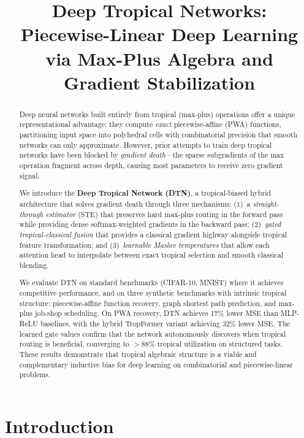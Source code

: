 \documentclass[11pt,twocolumn]{article}
\title{Deep Tropical Networks: Piecewise-Linear Deep Learning\\via Max-Plus Algebra and Gradient Stabilization}
\author{%
}
\date{}
\begin{document}
\maketitle

\begin{abstract}
Deep neural networks built entirely from tropical (max-plus) operations
offer a unique representational advantage: they compute \emph{exact}
piecewise-affine (PWA) functions, partitioning input space into polyhedral
cells with combinatorial precision that smooth networks can only approximate.
However, prior attempts to train deep tropical networks have been blocked by
\emph{gradient death}---the sparse subgradients of the max operation fragment
across depth, causing most parameters to receive zero gradient signal.

We introduce the \textbf{Deep Tropical Network (DTN)}, a tropical-biased
hybrid architecture that solves gradient death through three mechanisms:
(1)~a \emph{straight-through estimator} (STE) that preserves hard max-plus
routing in the forward pass while providing dense softmax-weighted gradients
in the backward pass;
(2)~\emph{gated tropical-classical fusion} that provides a classical gradient
highway alongside tropical feature transformation; and
(3)~\emph{learnable Maslov temperatures} that allow each attention head to
interpolate between exact tropical selection and smooth classical blending.

We evaluate DTN on standard benchmarks (CIFAR-10, MNIST) where it achieves
competitive performance, and on three synthetic benchmarks with intrinsic
tropical structure: piecewise-affine function recovery, graph shortest path
prediction, and max-plus job-shop scheduling. On PWA recovery, DTN achieves
17\% lower MSE than MLP-ReLU baselines, with the hybrid TropFormer variant
achieving 32\% lower MSE. The learned gate values confirm that the network
autonomously discovers when tropical routing is beneficial, converging to
$>88\%$ tropical utilization on structured tasks. These results demonstrate
that tropical algebraic structure is a viable and complementary inductive bias
for deep learning on combinatorial and piecewise-linear problems.
\end{abstract}

\section{Introduction}\label{sec:intro}
\end{document}
